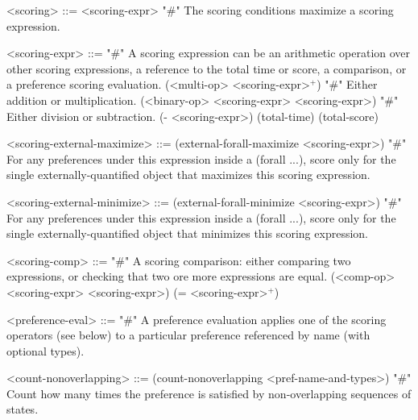 \documentclass{article}
\begin{document}
\begin{grammar}
<scoring> ::= <scoring-expr> "#" The scoring conditions maximize a scoring expression. 

<scoring-expr> ::= "#" A scoring expression can be an arithmetic operation over other scoring expressions, a reference to the total time or score, a comparison, or a preference scoring evaluation.
        \alt (<multi-op> <scoring-expr>$^+$) "#" Either addition or multiplication.
        \alt (<binary-op> <scoring-expr> <scoring-expr>) "#" Either division or subtraction.
        \alt (- <scoring-expr>)
        \alt (total-time) 
        \alt (total-score) 
        
    

<scoring-external-maximize> ::= (external-forall-maximize <scoring-expr>) "#" For any preferences under this expression inside a (forall ...), score only for the single externally-quantified object that maximizes this scoring expression.
    

<scoring-external-minimize> ::= (external-forall-minimize <scoring-expr>) "#" For any preferences under this expression inside a (forall ...), score only for the single externally-quantified object that minimizes this scoring expression.
    

<scoring-comp> ::=  "#" A scoring comparison: either comparing two expressions, or checking that two ore more expressions are equal.
        \alt (<comp-op> <scoring-expr> <scoring-expr>) 
        \alt (= <scoring-expr>$^+$)
    

<preference-eval> ::= "#" A preference evaluation applies one of the scoring operators (see below) to a particular preference referenced by name (with optional types). 

    

<count-nonoverlapping> ::= (count-nonoverlapping <pref-name-and-types>) "#" Count how many times the preference is satisfied by non-overlapping sequences of states.


\end{grammar}
\end{document}
